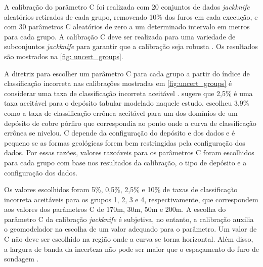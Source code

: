 A calibração do parâmetro C foi realizada com 20 conjuntos de dados \textit{jackknife} aleatórios retirados de cada grupo, removendo 10\% dos furos em cada execução, e com 30 parâmetros C aleatórios de zero a um determinado intervalo em metros para cada grupo. A calibração C deve ser realizada para uma variedade de subconjuntos \textit{jackknife} para garantir que a calibração seja robusta . Os resultados são mostrados na \autoref{fig: uncert_groups}.

A diretriz para escolher um parâmetro C para cada grupo a partir do índice de classificação incorreta nas calibrações mostradas em \autoref{fig:uncert_groups} é considerar uma taxa de classificação incorreta aceitável .  sugere que 2,5\% é uma taxa aceitável para o depósito tabular modelado naquele estudo.  escolheu 3,9\% como a taxa de classificação errônea aceitável para um dos domínios de um depósito de cobre pórfiro que correspondia ao ponto onde a curva de classificação errônea se nivelou. C depende da configuração do depósito e dos dados e é pequeno se as formas geológicas forem bem restringidas pela configuração dos dados. Por essas razões, valores razoáveis para os parâmetros C foram escolhidos para cada grupo com base nos resultados da calibração, o tipo de depósito e a configuração dos dados.

Os valores escolhidos foram 5\%, 0,5\%, 2,5\% e 10\% de taxas de classificação incorreta aceitáveis para os grupos 1, 2, 3 e 4, respectivamente, que correspondem aos valores dos parâmetros C de 170m, 30m, 50m e 200m. A escolha do parâmetro C da calibração \textit{jackknife} é subjetiva, no entanto, a calibração auxilia o geomodelador na escolha de um valor adequado para o parâmetro. Um valor de C não deve ser escolhido na região onde a curva se torna horizontal. Além disso, a largura de banda da incerteza não pode ser maior que o espaçamento do furo de sondagem .

